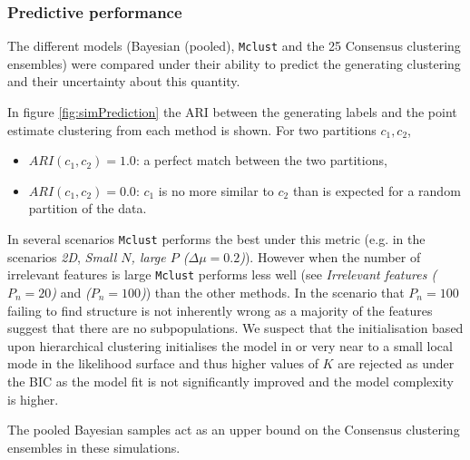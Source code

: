 \documentclass[]{article}
\begin{document}
\subsubsection{Predictive performance}
The different models (Bayesian (pooled), \texttt{Mclust} and the 25 Consensus clustering ensembles) were compared under their ability to predict the generating clustering and their uncertainty about this quantity.

In figure \ref{fig:simPrediction} the ARI between the generating labels and the point estimate clustering from each method is shown. For two partitions $c_1, c_2$, 
\begin{itemize}
	\item $ARI(c_1, c_2) = 1.0$: a perfect match between the two partitions,
	\item $ARI(c_1, c_2) = 0.0$: $c_1$ is no more similar to $c_2$ than is expected for a random partition of the data.
\end{itemize}
In several scenarios \texttt{Mclust} performs the best under this metric (e.g. in the scenarios \emph{2D}, \emph{Small $N$, large $P$ ($\Delta \mu = 0.2$)}). However when the number of irrelevant features is large \texttt{Mclust} performs less well (see \emph{Irrelevant features ($P_n = 20$)} and \emph{($P_n = 100$)}) than the other methods. In the scenario that $P_n = 100$ failing to find structure is not inherently wrong as a majority of the features suggest that there are no subpopulations. We suspect that the initialisation based upon hierarchical clustering initialises the model in or very near to a small local mode in the likelihood surface and thus higher values of $K$ are rejected as under the BIC as the model fit is not significantly improved and the model complexity is higher. 

The pooled Bayesian samples act as an upper bound on the Consensus clustering ensembles in these simulations.
\end{document}
